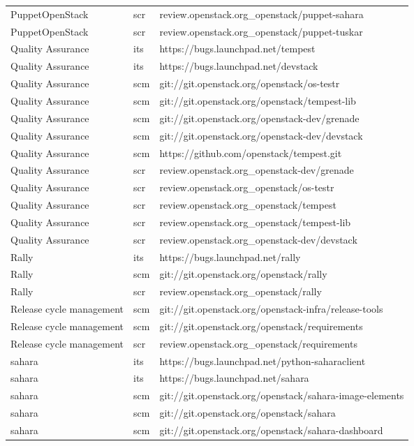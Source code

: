 \begin{center}
\begin{longtable}{|p{4cm}|p{1cm}|p{10cm}|}
PuppetOpenStack&scr&review.openstack.org\_openstack/puppet-sahara\\ 
PuppetOpenStack&scr&review.openstack.org\_openstack/puppet-tuskar\\ 
Quality Assurance&its&https://bugs.launchpad.net/tempest\\ 
Quality Assurance&its&https://bugs.launchpad.net/devstack\\ 
Quality Assurance&scm&git://git.openstack.org/openstack/os-testr\\ 
Quality Assurance&scm&git://git.openstack.org/openstack/tempest-lib\\ 
Quality Assurance&scm&git://git.openstack.org/openstack-dev/grenade\\ 
Quality Assurance&scm&git://git.openstack.org/openstack-dev/devstack\\ 
Quality Assurance&scm&https://github.com/openstack/tempest.git\\ 
Quality Assurance&scr&review.openstack.org\_openstack-dev/grenade\\ 
Quality Assurance&scr&review.openstack.org\_openstack/os-testr\\ 
Quality Assurance&scr&review.openstack.org\_openstack/tempest\\ 
Quality Assurance&scr&review.openstack.org\_openstack/tempest-lib\\ 
Quality Assurance&scr&review.openstack.org\_openstack-dev/devstack\\ 
Rally&its&https://bugs.launchpad.net/rally\\ 
Rally&scm&git://git.openstack.org/openstack/rally\\ 
Rally&scr&review.openstack.org\_openstack/rally\\ 
Release cycle management&scm&git://git.openstack.org/openstack-infra/release-tools\\ 
Release cycle management&scm&git://git.openstack.org/openstack/requirements\\ 
Release cycle management&scr&review.openstack.org\_openstack/requirements\\ 
sahara&its&https://bugs.launchpad.net/python-saharaclient\\ 
sahara&its&https://bugs.launchpad.net/sahara\\ 
sahara&scm&git://git.openstack.org/openstack/sahara-image-elements\\ 
sahara&scm&git://git.openstack.org/openstack/sahara\\ 
sahara&scm&git://git.openstack.org/openstack/sahara-dashboard\\ 

\end{longtable}
\end{center}
